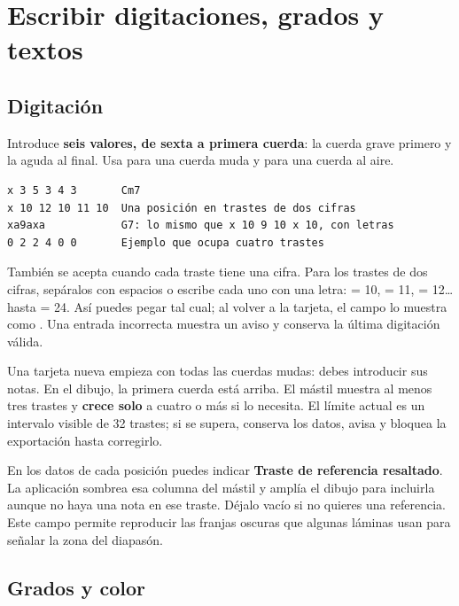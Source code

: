 \documentclass[a4paper,11pt]{article}
\let\originaltexttt\texttt
\renewcommand{\texttt}[1]{\originaltexttt{\seqsplit{#1}}}
\begin{document}
\Needspace{3.5cm}
\section{Escribir digitaciones, grados y
textos}\label{escribir-digitaciones-grados-y-textos}

\subsection{Digitación}\label{digitaciuxf3n}

Introduce \textbf{seis valores, de sexta a primera cuerda}: la cuerda
grave primero y la aguda al final. Usa \texttt{x} para una cuerda muda y
\texttt{0} para una cuerda al aire.

\begin{verbatim}
x 3 5 3 4 3       Cm7
x 10 12 10 11 10  Una posición en trastes de dos cifras
xa9axa            G7: lo mismo que x 10 9 10 x 10, con letras
0 2 2 4 0 0       Ejemplo que ocupa cuatro trastes
\end{verbatim}

También se acepta \texttt{x35343} cuando cada traste tiene una cifra.
Para los trastes de dos cifras, sepáralos con espacios o escribe cada
uno con una letra: \texttt{a} = 10, \texttt{b} = 11, \texttt{c} =
12\ldots{} hasta \texttt{o} = 24. Así puedes pegar \texttt{xa9axa} tal
cual; al volver a la tarjeta, el campo lo muestra como
\texttt{x\ 10\ 9\ 10\ x\ 10}. Una entrada incorrecta muestra un aviso y
conserva la última digitación válida.

Una tarjeta nueva empieza con todas las cuerdas mudas: debes introducir
sus notas. En el dibujo, la primera cuerda está arriba. El mástil
muestra al menos tres trastes y \textbf{crece solo} a cuatro o más si lo
necesita. El límite actual es un intervalo visible de 32 trastes; si se
supera, conserva los datos, avisa y bloquea la exportación hasta
corregirlo.

En los datos de cada posición puedes indicar \textbf{Traste de
referencia resaltado}. La aplicación sombrea esa columna del mástil y
amplía el dibujo para incluirla aunque no haya una nota en ese traste.
Déjalo vacío si no quieres una referencia. Este campo permite reproducir
las franjas oscuras que algunas láminas usan para señalar la zona del
diapasón.

\subsection{Grados y color}\label{grados-y-color}
\end{document}
